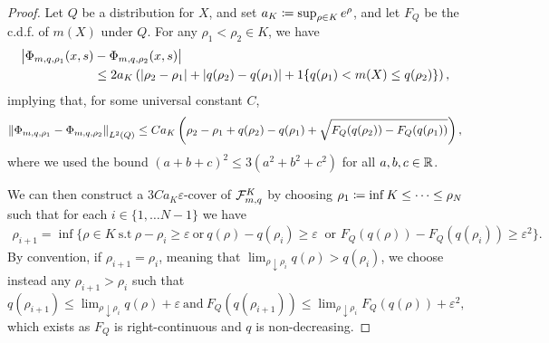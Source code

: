\begin{proof}
  Let $Q$ be a distribution for $X$, and set $a_K \coloneqq \sup_{\rho \in K}
  e^\rho$, and let $F_{Q}$ be the c.d.f. of $m(X)$ under $Q$.  For any
  $\rho_1 < \rho_2 \in K$, we have
  \begin{align*}
    \big| \Phi_{m,  q, \rho_1}(x,s) &- \Phi_{m,  q, \rho_2}(x,s)\big| \\
    &\le 2 a_K \left( \left| \rho_2 - \rho_1 \right| + \left| q(\rho_2) - q(\rho_1) \right|  + 1\!\left\{ q(\rho_1) < m(X) \le q(\rho_2)\right\}\right),
  \end{align*}
  implying that, for some universal constant $C$, 
  \begin{align*}
    \left\|{\Phi_{m,  q, \rho_1} - \Phi_{m,  q, \rho_2}}\right\|_{L^2(Q)}
    \le C a_K \left( \rho_2 - \rho_1 + q(\rho_2) - q(\rho_1) + \sqrt{F_{Q}(q(\rho_2)) - F_{Q}(q(\rho_1))} \right),
  \end{align*}
  where we used the bound $(a+b+c)^2 \le 3(a^2 + b^2 + c^2)$ for all $a,b,c
  \in \mathbb{R}$.


We can then construct a $3C a_K \varepsilon$-cover of $\mathcal{F}_{m, q}^K$ by choosing $\rho_1 \coloneqq \inf K \le \dots \le \rho_N$ such that for each $i \in \{1, \dots N-1\}$ we have
\begin{align*}
\rho_{i+1} = \inf \biggr\{ \rho \in K ~ \text{s.t} ~  \rho - \rho_{i} \ge \varepsilon ~\text{or} ~ q(\rho) - q(\rho_i)\ge \varepsilon  ~ \text{ or } F_{Q}(q(\rho)) - F_{Q}(q(\rho_i)) \ge \varepsilon^2 \biggr\}.
\end{align*}
By convention, if $\rho_{i+1} = \rho_i$,  meaning that $\lim_{\rho \downarrow \rho_i} q(\rho) > q(\rho_i)$,  we choose instead any $\rho_{i+1} > \rho_i$ such that
$
q(\rho_{i+1})\le \lim_{\rho \downarrow \rho_i} q(\rho) + \varepsilon 
~\text{and} ~
F_{Q}(q(\rho_{i+1})) \le \lim_{\rho \downarrow \rho_i} F_{Q}(q(\rho)) + \varepsilon^2,
$
which exists as $F_Q$ is right-continuous and $q$ is non-decreasing.


\end{proof}
